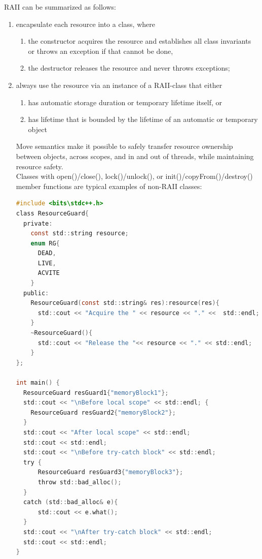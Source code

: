 \documentclass[a4paper]{article}
\theoremstyle{definition}
\begin{document}
RAII can be summarized as follows:
\begin{enumerate}
  \item encapsulate each resource into a class, where
  \begin{enumerate}
    \item the constructor acquires the resource and establishes all class invariants or throws an exception if that cannot be done,
    \item the destructor releases the resource and never throws exceptions;
    
  \end{enumerate}
  \item always use the resource via an instance of a RAII-class that either
  \begin{enumerate}
    \item has automatic storage duration or temporary lifetime itself, or
\item    has lifetime that is bounded by the lifetime of an automatic or temporary object
  \end{enumerate}
  Move semantics make it possible to safely transfer resource ownership between objects, across scopes, and in and out of threads, while maintaining resource safety.
\\
  Classes with open()/close(), lock()/unlock(), or init()/copyFrom()/destroy() member functions are typical examples of non-RAII classes:

  \begin{lstlisting}[language=c]
#include <bits\stdc++.h>
class ResourceGuard{
  private:
    const std::string resource;
    enum RG{
      DEAD,
      LIVE,
      ACVITE
    }
  public:
    ResourceGuard(const std::string& res):resource(res){
      std::cout << "Acquire the " << resource << "." <<  std::endl;
    }
    ~ResourceGuard(){
      std::cout << "Release the "<< resource << "." << std::endl;
    }
};

int main() {
  ResourceGuard resGuard1{"memoryBlock1"};
  std::cout << "\nBefore local scope" << std::endl; {
    ResourceGuard resGuard2{"memoryBlock2"};
  }
  std::cout << "After local scope" << std::endl;
  std::cout << std::endl;
  std::cout << "\nBefore try-catch block" << std::endl;
  try {
      ResourceGuard resGuard3{"memoryBlock3"};
      throw std::bad_alloc();
  }   
  catch (std::bad_alloc& e){
      std::cout << e.what();
  }
  std::cout << "\nAfter try-catch block" << std::endl;
  std::cout << std::endl;
}
  \end{lstlisting}
\end{enumerate}
\end{document}
